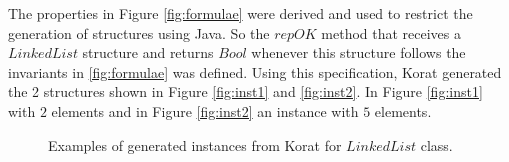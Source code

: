 \begin{code}
The properties in Figure \ref{fig:formulae} were derived and used to restrict the generation of structures using Java. So the $repOK$ method that receives
a $LinkedList$ structure and returns $Bool$ whenever this structure follows the invariants in \ref{fig:formulae} was defined.
Using this specification, Korat generated the 2 structures shown in Figure \ref{fig:inst1} and \ref{fig:inst2}. In Figure \ref{fig:inst1} with $2$ elements
and in Figure \ref{fig:inst2} an instance with $5$ elements.
\begin{figure}[!ht]
\centerline{
\hfil
{}}
\caption{Examples of generated instances from Korat for $LinkedList$ class.}
\label{fig:insts}
\end{figure}


\end{code}
